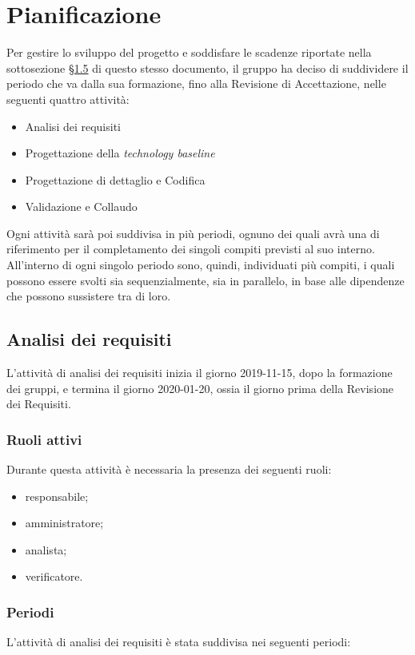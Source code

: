 \section{Pianificazione}
	Per gestire lo sviluppo del progetto e soddisfare le scadenze riportate nella sottosezione \hyperref[riferimento_scadenze]{§1.5} di questo stesso documento, il gruppo ha deciso di suddividere il periodo che va dalla sua formazione, fino alla Revisione di Accettazione, nelle seguenti quattro attività:
	\begin{itemize}
		\item Analisi dei requisiti
		\item Progettazione della \textit{technology baseline}
		\item Progettazione di dettaglio e Codifica
		\item Validazione e Collaudo
	\end{itemize}
	Ogni attività sarà poi suddivisa in più periodi, ognuno dei quali avrà una  di riferimento per il completamento dei singoli compiti previsti al suo interno. All'interno di ogni singolo periodo sono, quindi, individuati più compiti, i quali possono essere svolti sia sequenzialmente, sia in parallelo, in base alle dipendenze che possono sussistere tra di loro.
	
	\subsection{Analisi dei requisiti}
		L'attività di analisi dei requisiti inizia il giorno 2019-11-15, dopo la formazione dei gruppi, e termina il giorno 2020-01-20, ossia il giorno prima della Revisione dei Requisiti.
		\subsubsection{Ruoli attivi}
			Durante questa attività è necessaria la presenza dei seguenti ruoli:
			\begin{itemize}
				\item responsabile;
				\item amministratore;
				\item analista;
				\item verificatore.
			\end{itemize}
		\subsubsection{Periodi}
			L'attività di analisi dei requisiti è stata suddivisa nei seguenti periodi:
